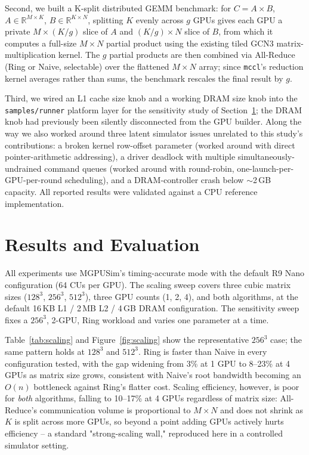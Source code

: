 \documentclass[conference]{IEEEtran}
\begin{document}
Second, we built a K-split distributed GEMM benchmark: for $C = A \times B$, $A \in \mathbb{R}^{M \times K}$, $B \in \mathbb{R}^{K \times N}$, splitting $K$ evenly across $g$ GPUs gives each GPU a private $M \times (K/g)$ slice of $A$ and $(K/g) \times N$ slice of $B$, from which it computes a full-size $M \times N$ partial product using the existing tiled GCN3 matrix-multiplication kernel. The $g$ partial products are then combined via All-Reduce (Ring or Naive, selectable) over the flattened $M \times N$ array; since \texttt{mccl}'s reduction kernel averages rather than sums, the benchmark rescales the final result by $g$.

Third, we wired an L1 cache size knob and a working DRAM size knob into the \texttt{samples/runner} platform layer for the sensitivity study of Section~\ref{sec:results}; the DRAM knob had previously been silently disconnected from the GPU builder. Along the way we also worked around three latent simulator issues unrelated to this study's contributions: a broken kernel row-offset parameter (worked around with direct pointer-arithmetic addressing), a driver deadlock with multiple simultaneously-undrained command queues (worked around with round-robin, one-launch-per-GPU-per-round scheduling), and a DRAM-controller crash below $\sim$2\,GB capacity. All reported results were validated against a CPU reference implementation.

\section{Results and Evaluation}
\label{sec:results}

All experiments use MGPUSim's timing-accurate mode with the default R9 Nano configuration (64 CUs per GPU). The scaling sweep covers three cubic matrix sizes ($128^3$, $256^3$, $512^3$), three GPU counts (1, 2, 4), and both algorithms, at the default 16\,KB L1 / 2\,MB L2 / 4\,GB DRAM configuration. The sensitivity sweep fixes a $256^3$, 2-GPU, Ring workload and varies one parameter at a time.

Table~\ref{tab:scaling} and Figure~\ref{fig:scaling} show the representative $256^3$ case; the same pattern holds at $128^3$ and $512^3$. Ring is faster than Naive in every configuration tested, with the gap widening from 3\% at 1 GPU to 8--23\% at 4 GPUs as matrix size grows, consistent with Naive's root bandwidth becoming an $O(n)$ bottleneck against Ring's flatter cost. Scaling efficiency, however, is poor for \emph{both} algorithms, falling to 10--17\% at 4 GPUs regardless of matrix size: All-Reduce's communication volume is proportional to $M \times N$ and does not shrink as $K$ is split across more GPUs, so beyond a point adding GPUs actively hurts efficiency -- a standard "strong-scaling wall," reproduced here in a controlled simulator setting.
\end{document}
